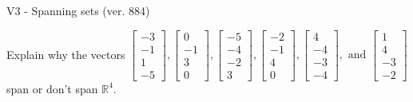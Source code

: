 \begin{exercise}
  \begin{exerciseTitle}V3 - Spanning sets (ver. 884)\end{exerciseTitle}
  \begin{exerciseStatement}
    Explain why the vectors \(\left[\begin{array}{r}
-3 \\
-1 \\
1 \\
-5
\end{array}\right] , \left[\begin{array}{r}
0 \\
-1 \\
3 \\
0
\end{array}\right] , \left[\begin{array}{r}
-5 \\
-4 \\
-2 \\
3
\end{array}\right] , \left[\begin{array}{r}
-2 \\
-1 \\
4 \\
0
\end{array}\right] , \left[\begin{array}{r}
4 \\
-4 \\
-3 \\
-4
\end{array}\right] , \text{ and } \left[\begin{array}{r}
1 \\
4 \\
-3 \\
-2
\end{array}\right]\) span or don't span \(\mathbb{R}^4\). 
	



\end{exerciseStatement}
\end{exercise}
